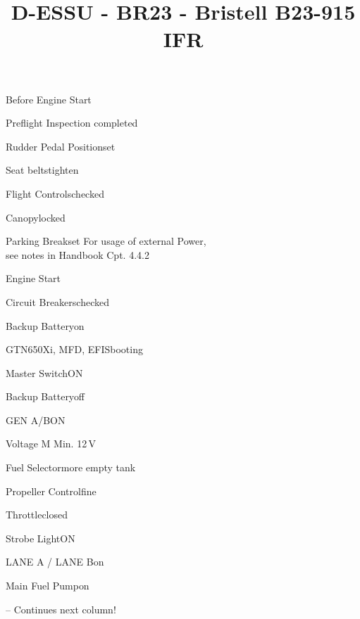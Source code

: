 \def\papersize{4}




\title{D-ESSU  -  BR23  -  Bristell B23-915 IFR}

\begin{checklist}{Before Engine Start}
  \item{Preflight Inspection  }{completed}
  \item{Rudder Pedal Position}{set}
  \item{Seat belts}{tighten}
  \item{Flight Controls}{checked}
  \item{Canopy}{locked}
  \item{Parking Break}{set}
For usage of external Power,\\see notes in Handbook Cpt. 4.4.2
\end{checklist}

\begin{checklist}{Engine Start}
  \item{Circuit Breakers}{checked}
  \item{Backup Battery}{on}
  \item{GTN650Xi, MFD, EFIS}{booting}
  \item{Master Switch}{ON}
  \item{Backup Battery}{off}
  \item{GEN A/B}{ON}
  \item{Voltage M }{Min. 12\,V}
  \item{Fuel Selector}{more empty tank}
  \item{Propeller Control}{fine}
  \item{Throttle}{closed}
  \item{Strobe Light}{ON}
  \item{LANE A / LANE B}{on}
  \item{Main Fuel Pump}{on} 

-- Continues next column!
\end{checklist}

